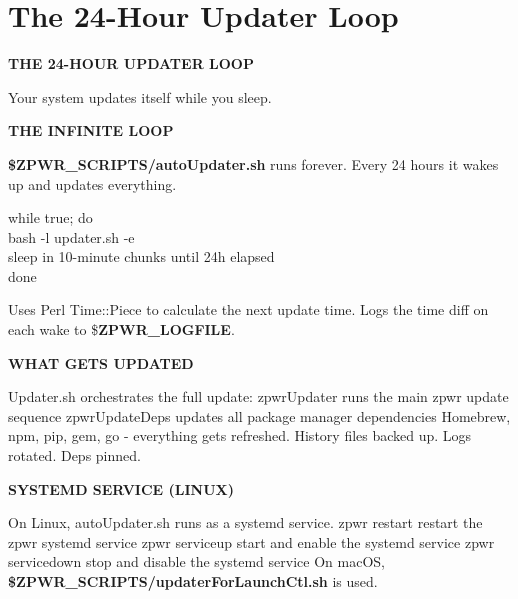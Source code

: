 \documentclass[11pt,a4paper,twoside]{book}
\begin{document}
\vspace{16pt}

\section{The 24-Hour Updater Loop}


\vspace{10pt}
{\large\bfseries\color{neoncyan} THE 24-HOUR UPDATER LOOP}\vspace{6pt}

Your system updates itself while you sleep.


\vspace{12pt}
{\bfseries\color{neonyellow} THE INFINITE LOOP}\vspace{4pt}

\textbf{\$ZPWR\_SCRIPTS/autoUpdater.sh} runs forever. Every 24 hours it wakes up and updates everything.

\begin{codebox}
\color{neongreen}while true; do\\
\color{neongreen}bash -l updater.sh -e\\
\color{neongreen}{\char`\#} sleep in 10-minute chunks until 24h elapsed\\
\color{neongreen}done\\
\end{codebox}

Uses Perl Time::Piece to calculate the next update time. Logs the time diff on each wake to \$\textbf{ZPWR\_LOGFILE}.


\vspace{12pt}
{\bfseries\color{neonyellow} WHAT GETS UPDATED}\vspace{4pt}

Updater.sh orchestrates the full update: zpwrUpdater      runs the main zpwr update sequence zpwrUpdateDeps   updates all package manager dependencies Homebrew, npm, pip, gem, go - everything gets refreshed. History files backed up. Logs rotated. Deps pinned.


\vspace{12pt}
{\bfseries\color{neonyellow} SYSTEMD SERVICE (LINUX)}\vspace{4pt}

On Linux, autoUpdater.sh runs as a systemd service. zpwr restart      restart the zpwr systemd service zpwr serviceup    start and enable the systemd service zpwr servicedown  stop and disable the systemd service On macOS, \textbf{\$ZPWR\_SCRIPTS/updaterForLaunchCtl.sh} is used.
\end{document}
